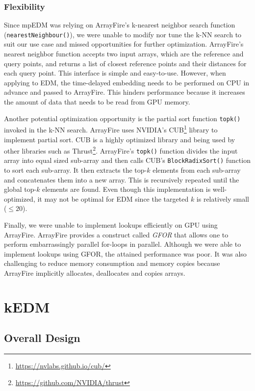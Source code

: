 \documentclass[conference]{IEEEtran}
\begin{document}
\subsubsection{Flexibility}

Since mpEDM was relying on ArrayFire's k-nearest neighbor search function
(\texttt{nearestNeighbour()}), we were unable to modify nor tune the k-NN
search to suit our use case and missed opportunities for further optimization.
ArrayFire's nearest neighbor function accepts two input arrays, which are the
reference and query points, and returns a list of closest reference points and
their distances for each query point. This interface is simple and
easy-to-use. However, when applying to EDM, the time-delayed embedding needs
to be performed on CPU in advance and passed to ArrayFire. This hinders
performance because it increases the amount of data that needs to be read from
GPU memory.

Another potential optimization opportunity is the partial sort function
\texttt{topk()} invoked in the k-NN search. ArrayFire uses NVIDIA's
CUB\footnote{\url{https://nvlabs.github.io/cub/}} library to implement partial
sort. CUB is a highly optimized library and being used by other libraries such
as Thrust\footnote{\url{https://github.com/NVIDIA/thrust}}. ArrayFire's
\texttt{topk()} function divides the input array into equal sized sub-array
and then calls CUB's \texttt{BlockRadixSort()} function to sort each
sub-array. It then extracts the top-$k$ elements from each sub-array and
concatenates them into a new array. This is recursively repeated until the
global top-$k$ elements are found. Even though this implementation is
well-optimized, it may not be optimal for EDM since the targeted $k$ is
relatively small ($\leq 20$).

Finally, we were unable to implement lookups efficiently on GPU using
ArrayFire. ArrayFire provides a construct called \textit{GFOR} that allows one
to perform embarrassingly parallel for-loops in parallel. Although we were
able to implement lookups using GFOR, the attained performance was poor. It
was also challenging to reduce memory consumption and memory copies because
ArrayFire implicitly allocates, deallocates and copies arrays.

\section{kEDM}

\subsection{Overall Design}
\end{document}
